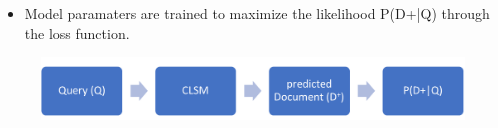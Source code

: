 \begin{multicols*}{3}
\begin{figure}
\end{figure}



\begin{itemize}
	\item Model paramaters are trained to maximize the likelihood P(D+|Q) through the loss function.
\end{itemize}

\vspace{5mm}
\begin{figure}
	
	\includegraphics[width = \textwidth]{./learning.png}\\
	
\end{figure}

\columnbreak




\end{multicols*}
